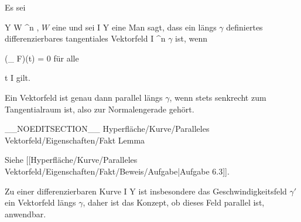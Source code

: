 {}
{

Es sei

\mavergleichskette
{\vergleichskette
{ Y
}
{ \subseteq }{ W
}
{ \subseteq }{ \R^n
}
{    }{
}
{   }{
}
}
{}{}{,}
$W$
eine
und sei
\maabb {\gamma} { I } { Y
} {}
eine
Man sagt, dass ein längs $\gamma$ definiertes differenzierbares tangentiales Vektorfeld
 { I } {\R^n
} {}
$\gamma$ ist, wenn

\mavergleichskettedisp
{\vergleichskette
{ (\nabla_{\gamma} F)(t)
}
{ =} { 0
}
{ } {
}
{ } {
}
{ } {
}
}
{}{}{}
für alle

\mavergleichskette
{\vergleichskette
{ t
}
{ \in }{ I
}
{  }{
}
{    }{
}
{   }{
}
}
{}{}{}
gilt.

}

Ein Vektorfeld ist genau dann parallel längs $\gamma$, wenn
 stets senkrecht zum Tangentialraum
 ist, also zur Normalengerade gehört.

__NOEDITSECTION__
{Hyperfläche/Kurve/Paralleles Vektorfeld/Eigenschaften/Fakt}
{Lemma}
{}
{

\faktzusatz {}
\faktzusatz {}

 }
{ Siehe [[Hyperfläche/Kurve/Paralleles Vektorfeld/Eigenschaften/Fakt/Beweis/Aufgabe|Aufgabe 6.3]]. }

Zu einer differenzierbaren Kurve
\maabbdisp {\gamma} { I } { Y
} {}
ist insbesondere das Geschwindigkeitsfeld $\gamma'$ ein Vektorfeld längs $\gamma$, daher ist das Konzept, ob dieses Feld parallel ist, anwendbar.

